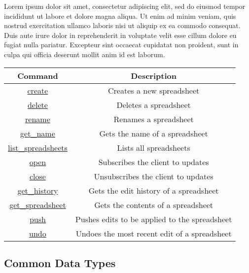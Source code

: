 Lorem ipsum dolor sit amet, consectetur adipiscing elit, sed do eiusmod tempor incididunt ut labore et dolore magna aliqua. Ut enim ad minim veniam, quis nostrud exercitation ullamco laboris nisi ut aliquip ex ea commodo consequat. Duis aute irure dolor in reprehenderit in voluptate velit esse cillum dolore eu fugiat nulla pariatur. Excepteur sint occaecat cupidatat non proident, sunt in culpa qui officia deserunt mollit anim id est laborum.

\begin{table}[H]
    \begin{center}
        \begin{tabular}{|c|c|}\hline
        Command & Description \\\hline
        \hyperref[sec:message:create]{create} & Creates a new spreadsheet \\\hline
        \hyperref[sec:message:delete]{delete} & Deletes a spreadsheet \\\hline
        \hyperref[sec:message:rename]{rename} & Renames a spreadsheet \\\hline
        \hyperref[sec:message:get_name]{get\_name} & Gets the name of a spreadsheet \\\hline
        \hyperref[sec:message:list]{list\_spreadsheets} & Lists all spreadsheets \\\hline
        \hyperref[sec:message:open]{open} & Subscribes the client to updates \\\hline
        \hyperref[sec:message:close]{close} & Unsubscribes the client to updates \\\hline
        \hyperref[sec:message:get_history]{get\_history} & Gets the edit history of a spreadsheet \\\hline
        \hyperref[sec:message:get_spreadsheet]{get\_spreadsheet} & Gets the contents of a spreadsheet \\\hline
        \hyperref[sec:message:push]{push} & Pushes edits to be applied to the spreadsheet \\\hline
        \hyperref[sec:message:undo]{undo} & Undoes the most recent edit of a spreadsheet \\\hline
        \end{tabular}
    \end{center}
\end{table}

\lstset{language=json,frame=single,numbers=none,captionpos=b}

\subsection{Common Data Types}

